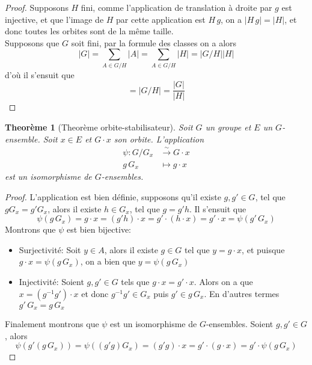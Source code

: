 \documentclass[french]{article}
\theoremstyle{plain}
\newtheorem{thm}{Theorème}[section]
\theoremstyle{remark}
\theoremstyle{definition}
\begin{document}
\begin{proof}
	Supposons $H$ fini, comme l'application de translation à droite par $g$ est injective,
	et que l'image de $H$ par cette application est $H\,g$,
	on a $|H\,g| = |H|$, et donc toutes les orbites sont de la même taille.\\
	Supposons que $G$ soit fini, par la formule des classes on a alors
	\begin{equation*}
		|G| = \sum_{A \in G/H}|A| = \sum_{A \in G/H}|H| = |G/H||H|
	\end{equation*}
	d'où il s'ensuit que
	\begin{equation*}
		[G:H] = |G/H| = \frac{|G|}{|H|}
	\end{equation*}
\end{proof}


\begin{thm}[Theorème orbite-stabilisateur]
	Soit $G$ un groupe et $E$ un $G$-ensemble.
	Soit $x \in E$ et $G \cdot x$ son orbite.
	L'application
	\begin{align*}
		\psi : G/G_x &\xrightarrow{\sim} G \cdot x\\
		g\,G_x &\mapsto g \cdot x
	\end{align*}
	est un isomorphisme de $G$-ensembles.
	
\end{thm}

\begin{proof}
	L'application est bien définie, supposons qu'il existe $g, g' \in G$,
	tel que $g G_x = g' G_x$, alors il existe $h \in G_x$,
	tel que $g = g' h$. Il s'ensuit que
	\begin{equation*}
		\psi(g\,G_x) = g \cdot x = (g' h) \cdot x
		= g' \cdot (h \cdot x) = g' \cdot x = \psi(g'\,G_x)
	\end{equation*}
	Montrons que $\psi$ est bien bijective:
	\begin{itemize}
		\item Surjectivité: Soit $y \in A$, alors il existe $g \in G$ tel que $y = g \cdot x$,
			et puisque $g \cdot x = \psi(g\,G_x)$, on a bien que $y = \psi(g\,G_x)$
		\item Injectivité: Soient $g, g' \in G$ tels que
			$g \cdot x = g' \cdot x$. Alors on a que $x = (g^{-1} g') \cdot x$ et donc
			$g^{-1} g' \in G_x$ puis $g' \in g\,G_x$.
			En d'autres termes $g'\,G_x = g\,G_x$
	\end{itemize}
	Finalement montrons que $\psi$ est un isomorphisme de $G$-ensembles.
	Soient $g, g'\in G$, alors
	\begin{equation*}
		\psi(g'(g\,G_x)) = \psi((g' g) G_x)
			= (g' g) \cdot x = g' \cdot (g \cdot x) = g' \cdot \psi(g\,G_x)
	\end{equation*}
\end{proof}
\end{document}
